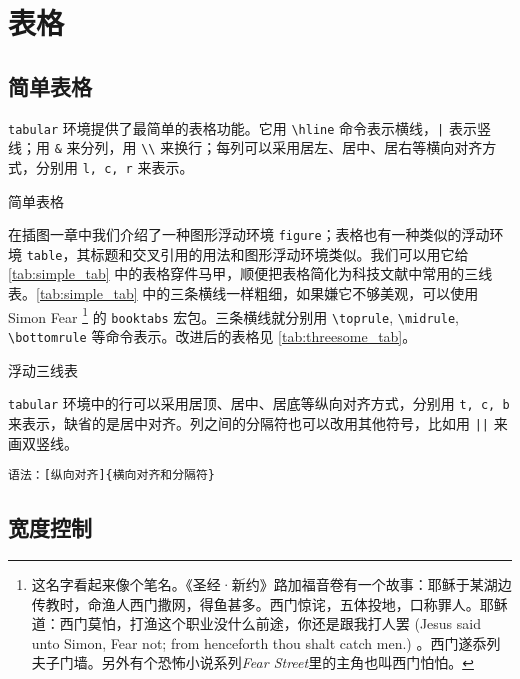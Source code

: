 \chapter{表格}
\section{简单表格}

\texttt{tabular} 环境提供了最简单的表格功能。它用 \verb|\hline| 命令表示横线，\verb+|+ 表示竖线；用 \verb|&| 来分列，用 \verb|\\| 来换行；每列可以采用居左、居中、居右等横向对齐方式，分别用 \texttt{l, c, r} 来表示。

\begin{example}[htbp]
\caption{简单表格}
\label{tab:simple_tab}
\end{example}


在插图一章中我们介绍了一种图形浮动环境 \texttt{figure}；表格也有一种类似的浮动环境 \texttt{table}，其标题和交叉引用的用法和图形浮动环境类似。我们可以用它给 \autoref{tab:simple_tab} 中的表格穿件马甲，顺便把表格简化为科技文献中常用的三线表。\autoref{tab:simple_tab} 中的三条横线一样粗细，如果嫌它不够美观，可以使用 Simon Fear\indexFear{} \footnote{这名字看起来像个笔名。《圣经·新约》路加福音卷有一个故事：耶稣于某湖边传教时，命渔人西门撒网，得鱼甚多。西门惊诧，五体投地，口称罪人。耶稣道：西门莫怕，打渔这个职业没什么前途，你还是跟我打人罢 (Jesus said unto Simon, Fear not; from henceforth thou shalt catch men.) 。西门遂忝列夫子门墙。另外有个恐怖小说系列\emph{Fear Street}里的主角也叫西门怕怕。} 的 \texttt{booktabs} 宏包\citep{Fear_booktabs}。三条横线就分别用 \verb|\toprule|, \verb|\midrule|, \verb|\bottomrule| 等命令表示。改进后的表格见 \autoref{tab:threesome_tab}。

\begin{example}[htbp]
\caption{浮动三线表}
\label{tab:threesome_tab}
\end{example}

\texttt{tabular} 环境中的行可以采用居顶、居中、居底等纵向对齐方式，分别用 \texttt{t, c, b} 来表示，缺省的是居中对齐。列之间的分隔符也可以改用其他符号，比如用 \verb+||+ 来画双竖线。

\verb|语法：[纵向对齐]{横向对齐和分隔符}|

\section{宽度控制}

